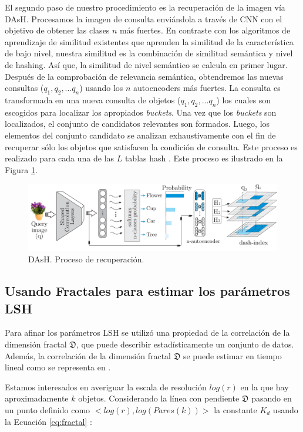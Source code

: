 El segundo paso de nuestro procedimiento es la recuperación de la imagen vía  DAsH. Procesamos la imagen de consulta enviándola a través de CNN con el objetivo de obtener las clases $n$ más fuertes. En contraste con los algoritmos de aprendizaje de similitud existentes que aprenden la similitud de la característica de bajo nivel, nuestra similitud es la combinación de similitud semántica y nivel de hashing. Así que, la similitud de nivel semántico se calcula en primer lugar. Después de la comprobación de relevancia semántica, obtendremos las nuevas consultas ($q_1, q_2, ... q_n$) usando los  $n$ autoencoders más fuertes. La consulta es transformada en una nueva consulta de objetos ($q_1, q_2, ... q_n$) los cuales son escogidos para localizar los apropiados \textit{buckets}. Una vez que los \textit{buckets} son localizados, el conjunto de candidatos relevantes son formados.  Luego, los elementos del conjunto candidato se analizan exhaustivamente con el fin de recuperar sólo los objetos que satisfacen la condición de consulta. Este proceso es realizado para cada una de las  $L$ tablas hash . Este proceso es ilustrado en la Figura \ref{fig:qdash}.  
\begin{figure}[htp]
\centering
 \includegraphics[width=1.00\columnwidth]{chapter6/DAsh_retrieval_final.pdf} 
 \caption{ DAsH. Proceso de recuperación. } 
\label{fig:qdash}
\end{figure} 
 
 \subsection{Usando Fractales para estimar los parámetros LSH}
 
Para afinar los parámetros LSH se utilizó una propiedad de la correlación de la dimensión fractal $\mathfrak{D}$, que puede describir estadísticamente un conjunto de datos. Además, la correlación de la dimensión fractal $\mathfrak{D}$ se puede estimar en tiempo lineal como se representa en \cite{traina2010fast}.

Estamos interesados en averiguar la escala de resolución $log(r)$ en la que hay aproximadamente $k$ objetos. Considerando la línea con pendiente $ \mathfrak{D} $ pasando en un punto definido como $<log (r), log(Pares (k))> $ la constante $ K_d $ usando la Ecuación \ref{eq:fractal} : 


